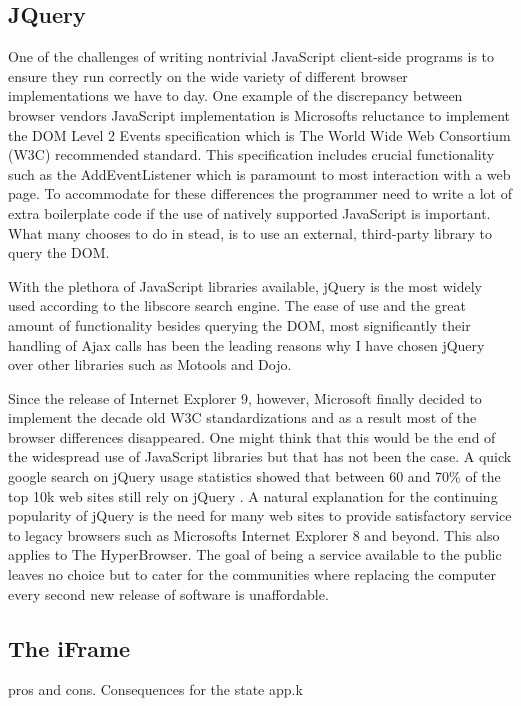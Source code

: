 \documentclass[english]{ifimaster}
\begin{document}
\subsection{JQuery}
One of the challenges of writing nontrivial JavaScript client-side programs is to ensure they run correctly on the wide variety of different browser implementations we have to day\parencite[p. 325]{flanagan}. One example of the discrepancy between browser vendors JavaScript implementation is Microsofts reluctance to implement the DOM Level 2 Events specification which is The World Wide Web Consortium (W3C) recommended standard\parencite{w3c}. This specification includes crucial functionality such as the AddEventListener which is paramount to most interaction with a web page. To accommodate for these differences the programmer need to write a lot of extra boilerplate code if the use of natively supported JavaScript is important. What many chooses to do in stead, is to use an external, third-party library to query the DOM. 

With the plethora of JavaScript libraries available, jQuery is the most widely used according to the libscore search engine\parencite{infoWorld}. The ease of use and the great amount of functionality besides querying the DOM, most significantly their handling of Ajax calls has been the leading reasons why I have chosen jQuery over other libraries such as Motools and Dojo. 

Since the release of Internet Explorer 9, however, Microsoft finally decided to implement the decade old W3C standardizations and as a result most of the browser differences disappeared. One might think that this would be the end of the widespread use of JavaScript libraries but that has not been the case. A quick google search on jQuery usage statistics showed that between 60 and 70\% of the top 10k web sites still rely on jQuery \parencite{jQueryWiki} \parencite{jQueryW3Tech}\parencite{builtWith}. A natural explanation for the continuing popularity of jQuery is the need for many web sites to provide satisfactory service to legacy browsers such as Microsofts Internet Explorer 8 and beyond. This also applies to The HyperBrowser. The goal of being a service available to the public leaves no choice but to cater for the communities where replacing the computer every second new release of software is unaffordable. 


\subsection{The iFrame}
pros and cons. Consequences for the state app.k
\end{document}
